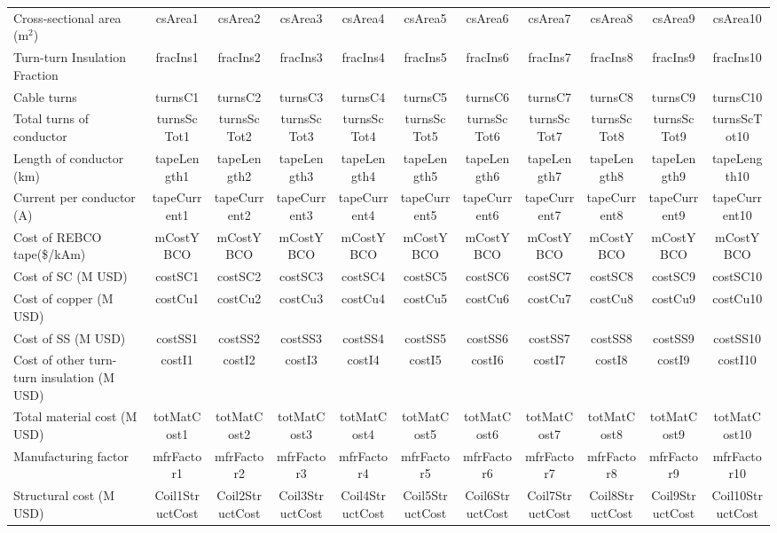 \begin{table}[h]
{\begin{tabular}{lcccccccccc}
Cross-sectional area (m$^2$) & csArea1 & csArea2 & csArea3 & csArea4 & csArea5 & csArea6 & csArea7 & csArea8 & csArea9 & csArea10 \\
Turn-turn Insulation Fraction & fracIns1 & fracIns2 & fracIns3 & fracIns4 & fracIns5 & fracIns6 & fracIns7 & fracIns8 & fracIns9 & fracIns10 \\
\hline
Cable turns & turnsC1 & turnsC2 & turnsC3 & turnsC4 & turnsC5 & turnsC6 & turnsC7 & turnsC8 & turnsC9 & turnsC10 \\
Total turns of conductor & turnsScTot1 & turnsScTot2 & turnsScTot3 & turnsScTot4 & turnsScTot5 & turnsScTot6 & turnsScTot7 & turnsScTot8 & turnsScTot9 & turnsScTot10 \\
Length of conductor (km) & tapeLength1 & tapeLength2 & tapeLength3 & tapeLength4 & tapeLength5 & tapeLength6 & tapeLength7 & tapeLength8 & tapeLength9 & tapeLength10 \\
Current per conductor (A) & tapeCurrent1 & tapeCurrent2 & tapeCurrent3 & tapeCurrent4 & tapeCurrent5 & tapeCurrent6 & tapeCurrent7 & tapeCurrent8 & tapeCurrent9 & tapeCurrent10 \\
\hline
Cost of REBCO tape(\$/kAm) & mCostYBCO & mCostYBCO & mCostYBCO & mCostYBCO & mCostYBCO & mCostYBCO & mCostYBCO & mCostYBCO & mCostYBCO & mCostYBCO \\
Cost of SC (M USD) & costSC1 & costSC2 & costSC3 & costSC4 & costSC5 & costSC6 & costSC7 & costSC8 & costSC9 & costSC10 \\
Cost of copper (M USD) & costCu1 & costCu2 & costCu3 & costCu4 & costCu5 & costCu6 & costCu7 & costCu8 & costCu9 & costCu10 \\
Cost of SS (M USD) & costSS1 & costSS2 & costSS3 & costSS4 & costSS5 & costSS6 & costSS7 & costSS8 & costSS9 & costSS10 \\
Cost of other turn-turn insulation (M USD) & costI1 & costI2 & costI3 & costI4 & costI5 & costI6 & costI7 & costI8 & costI9 & costI10 \\
Total material cost (M USD) & totMatCost1 & totMatCost2 & totMatCost3 & totMatCost4 & totMatCost5 & totMatCost6 & totMatCost7 & totMatCost8 & totMatCost9 & totMatCost10 \\
Manufacturing factor & mfrFactor1 & mfrFactor2 & mfrFactor3 & mfrFactor4 & mfrFactor5 & mfrFactor6 & mfrFactor7 & mfrFactor8 & mfrFactor9 & mfrFactor10 \\
Structural cost (M USD) & Coil1StructCost & Coil2StructCost & Coil3StructCost & Coil4StructCost & Coil5StructCost & Coil6StructCost & Coil7StructCost & Coil8StructCost & Coil9StructCost & Coil10StructCost \\

\end{tabular}}
\end{table}
